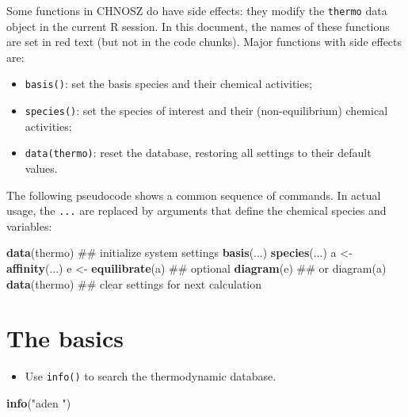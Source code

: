 \documentclass[]{tufte-book}
\newenvironment{Shaded}{}{}
\newcommand{\KeywordTok}[1]{\textcolor[rgb]{0.00,0.44,0.13}{\textbf{#1}}}
\newcommand{\StringTok}[1]{\textcolor[rgb]{0.25,0.44,0.63}{#1}}
\newcommand{\NormalTok}[1]{#1}
\providecommand{\tightlist}{%
  \setlength{\itemsep}{0pt}\setlength{\parskip}{0pt}}
\begin{document}
Some functions in CHNOSZ do have side effects: they modify the
\texttt{thermo} data object in the current R session. In this document,
the names of these functions are set in {red text} (but not in the code
chunks). Major functions with side effects are:

\begin{itemize}
\tightlist
\item
  {\texttt{basis()}}: set the basis species and their chemical
  activities;
\item
  {\texttt{species()}}: set the species of interest and their
  (non-equilibrium) chemical activities;
\item
  {\texttt{data(thermo)}}: reset the database, restoring all settings to
  their default values.
\end{itemize}

The following pseudocode shows a common sequence of commands. In actual
usage, the \texttt{...} are replaced by arguments that define the
chemical species and variables:

\begin{Shaded}
\begin{Highlighting}[]
\KeywordTok{data}\NormalTok{(thermo)         ## initialize system settings}
\KeywordTok{basis}\NormalTok{(...)}
\KeywordTok{species}\NormalTok{(...)}
\NormalTok{a <-}\StringTok{ }\KeywordTok{affinity}\NormalTok{(...)}
\NormalTok{e <-}\StringTok{ }\KeywordTok{equilibrate}\NormalTok{(a)  ## optional}
\KeywordTok{diagram}\NormalTok{(e)           ## or diagram(a)}
\KeywordTok{data}\NormalTok{(thermo)         ## clear settings for next calculation}
\end{Highlighting}
\end{Shaded}

\chapter{The basics}\label{the-basics}

\begin{itemize}
\tightlist
\item
  Use {\texttt{info()}} to search the thermodynamic database.
\end{itemize}

\begin{Shaded}
\begin{Highlighting}[]
\KeywordTok{info}\NormalTok{(}\StringTok{"aden "}\NormalTok{)}
\end{Highlighting}
\end{Shaded}
\end{document}
